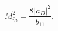 \begin{equation}
M_{\tilde{m}}^{2} =\frac{8\left| a_{D}\right| ^{2}}{b_{11}},  \label{masse}
\end{equation}

